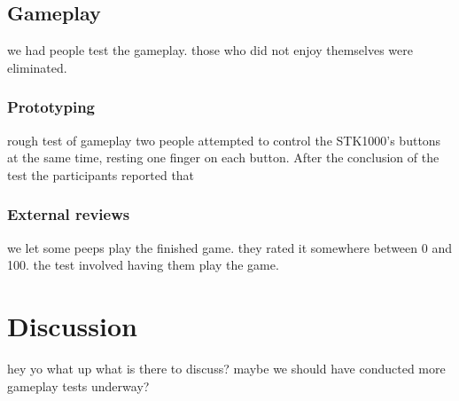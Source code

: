 \subsection{Gameplay}
	we had people test the gameplay.
	those who did not enjoy themselves were eliminated.
	\subsubsection{Prototyping}
		rough test of gameplay
		two people attempted to control the STK1000's buttons at the same time, resting one finger on each button.
		After the conclusion of the test the participants reported that 
	\subsubsection{External reviews}
		we let some peeps play the finished game.
		they rated it somewhere between 0 and 100.
		the test involved having them play the game.


\section{Discussion}
	hey yo what up what is there to discuss?
	maybe we should have conducted more gameplay tests underway?